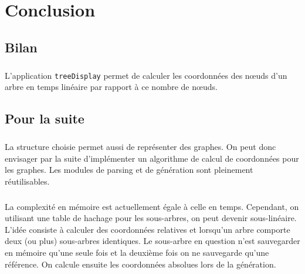 \chapter{Conclusion}

\section{Bilan}
\paragraph{}L'application \verb|treeDisplay| permet de calculer les coordonnées des n\oe uds d'un arbre en temps linéaire par rapport à ce nombre de n\oe uds.

\section{Pour la suite}

\paragraph{}La structure choisie permet aussi de représenter des graphes. On peut donc envisager par la suite d'implémenter un algorithme de calcul de coordonnées pour les graphes. Les modules de parsing et de génération sont pleinement réutilisables.

\paragraph{}La complexité en mémoire est actuellement égale à celle en temps. Cependant, on utilisant une table de hachage pour les sous-arbres, on peut devenir sous-linéaire. L'idée consiste à calculer des coordonnées relatives et lorsqu'un arbre comporte deux (ou plus) sous-arbres identiques. Le sous-arbre en question n'est sauvegarder en mémoire qu'une seule fois et la deuxième fois on ne sauvegarde qu'une référence. On calcule ensuite les coordonnées absolues lors de la génération.